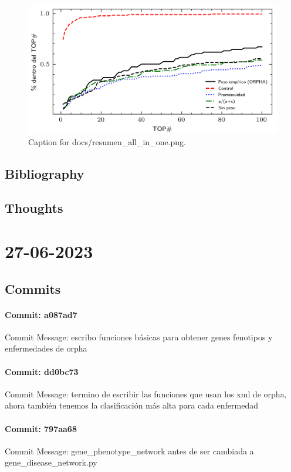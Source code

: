 \documentclass{article}
\begin{document}
\begin{figure}[h] \centering \includegraphics{docs/resumen_all_in_one.png} \caption{Caption for docs/resumen_all_in_one.png.} \end{figure}
\subsection{Bibliography}
\subsection{Thoughts}

\section{27-06-2023}
\subsection{Commits}
\paragraph{Commit: a087ad7}
Commit Message: escribo funciones básicas para obtener genes fenotipos y enfermedades de orpha

\paragraph{Commit: dd0bc73}
Commit Message: termino de escribir las funciones que usan los xml de orpha, ahora también tenemos la clasificación más alta para cada enfermedad

\paragraph{Commit: 797aa68}
Commit Message: gene_phenotype_network antes de ser cambiada a gene_disease_network.py
\end{document}
